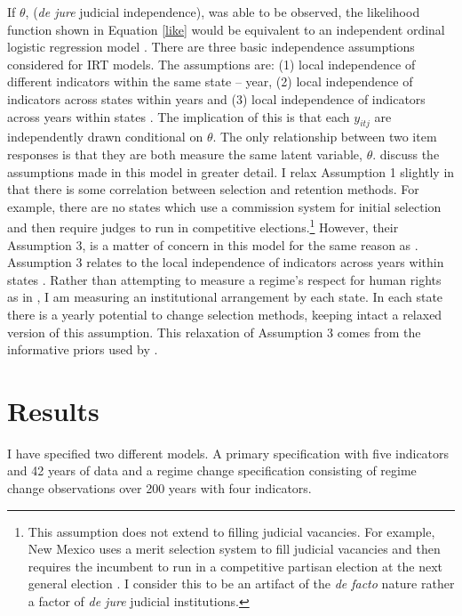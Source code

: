 \documentclass[12pt]{article}
\begin{document}
If $\theta$, (\textit{de jure} judicial independence), was able to be observed, the likelihood function shown in Equation \ref{like} would be equivalent to an independent ordinal logistic regression model \citep[8]{Schnakenberg2014}.  There are three basic independence assumptions considered for IRT models.  The assumptions are: (1) local independence of different indicators within the same state -- year, (2) local independence of indicators across states within years and (3) local independence of indicators across years within states \citep[8]{Schnakenberg2014}.  The implication of this is that each $y_{itj}$ are independently drawn conditional on $\theta$.  The only relationship between two item responses is that they are both measure the same latent variable, $\theta$. \citet[8]{Schnakenberg2014} discuss the assumptions made in this model in greater detail.  I relax Assumption 1 slightly in that there is some correlation between selection and retention methods. For example, there are no states which use a commission system for initial selection and then require judges to run in competitive elections.\footnote{This assumption does not extend to filling judicial vacancies.  For example, New Mexico uses a merit selection system to fill judicial vacancies and then requires the incumbent to run in a competitive partisan election at the next general election \citep{AJS}.  I consider this to be an artifact of the \textit{de facto} nature rather a factor of \textit{de jure} judicial institutions.}  However, their Assumption 3, is a matter of concern in this model for the same reason as \citet{Schnakenberg2014}.  Assumption 3 relates to the local independence of indicators across years within states \citep[8]{Schnakenberg2014}.  Rather than attempting to measure a regime's respect for human rights as in \citet{Schnakenberg2014}, I am measuring an institutional arrangement by each state.  In each state there is a yearly potential to change selection methods, keeping intact a relaxed version of this assumption.  This relaxation of Assumption 3 comes from the informative priors used by \citet[8]{Schnakenberg2014}.    

\section{Results}\label{Results}
I have specified two different models.  A primary specification with five indicators and 42 years of data and a regime change specification consisting of regime change observations over 200 years with four indicators.
\end{document}
